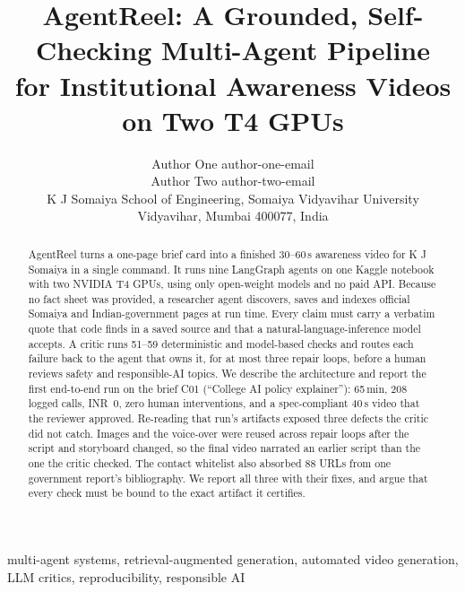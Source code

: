 \documentclass[twoside,11pt]{article}
\newcommand{\inr}{INR}
\begin{document}
\title{AgentReel: A Grounded, Self-Checking Multi-Agent Pipeline\\for Institutional Awareness Videos on Two T4 GPUs}

\author{\name Author One \email author-one-email \\
       \name Author Two \email author-two-email \\
       \addr K J Somaiya School of Engineering, Somaiya Vidyavihar University\\
       Vidyavihar, Mumbai 400077, India}

\editor{}

\maketitle

\begin{abstract}
AgentReel turns a one-page brief card into a finished 30--60\,s awareness video for K J Somaiya in a single command. It runs nine LangGraph agents on one Kaggle notebook with two NVIDIA T4 GPUs, using only open-weight models and no paid API. Because no fact sheet was provided, a researcher agent discovers, saves and indexes official Somaiya and Indian-government pages at run time. Every claim must carry a verbatim quote that code finds in a saved source and that a natural-language-inference model accepts. A critic runs 51--59 deterministic and model-based checks and routes each failure back to the agent that owns it, for at most three repair loops, before a human reviews safety and responsible-AI topics. We describe the architecture and report the first end-to-end run on the brief C01 (``College AI policy explainer''): 65\,min, 208 logged calls, \inr~0, zero human interventions, and a spec-compliant 40\,s video that the reviewer approved. Re-reading that run's artifacts exposed three defects the critic did not catch. Images and the voice-over were reused across repair loops after the script and storyboard changed, so the final video narrated an earlier script than the one the critic checked. The contact whitelist also absorbed 88 URLs from one government report's bibliography. We report all three with their fixes, and argue that every check must be bound to the exact artifact it certifies.
\end{abstract}

\begin{keywords}
  multi-agent systems, retrieval-augmented generation, automated video generation, LLM critics, reproducibility, responsible AI
\end{keywords}
\end{document}
